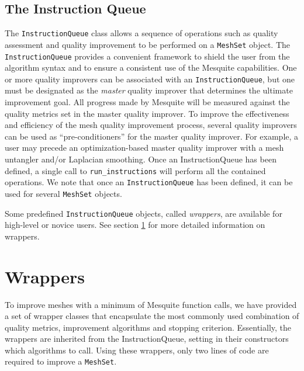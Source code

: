 \subsection{The Instruction Queue} \label{sec:IQ}

The \texttt{InstructionQueue} class allows a sequence of operations
such as quality assessment and quality improvement to be performed on
a \texttt{MeshSet} object. The \texttt{InstructionQueue} 
provides a convenient framework to shield the user
from the algorithm syntax and to ensure a consistent use of the
Mesquite capabilities.  One or more quality improvers can be
associated with an {\tt InstructionQueue}, but one must be designated
as the {\it master} quality improver that determines the ultimate 
improvement goal.  All progress made by Mesquite will be
measured against the quality metrics set in the master quality
improver.  To improve the effectiveness and efficiency of the mesh
quality improvement process, several quality improvers can be used as
``pre-conditioners'' for the master quality improver.  For example, a
user may precede an optimization-based master quality improver with a
mesh untangler and/or Laplacian smoothing.  Once an
InstructionQueue has been defined, a single call to \texttt{run\_instructions} 
will perform all the contained operations.  We note
that once an \texttt{InstructionQueue} has been defined, it can be used
for several \texttt{MeshSet} objects.


Some predefined \texttt{InstructionQueue} objects, called \emph
{wrappers}, are available for high-level or novice users.  See
section \ref{sec:wrappers} for more detailed information on wrappers.


\section{Wrappers}
\label{sec:wrappers}
To improve meshes with a minimum of Mesquite function calls, we have 
provided a set of wrapper classes that encapsulate the 
most commonly used combination of quality metrics, improvement
algorithms and stopping criterion. Essentially, the wrappers are
inherited from the InstructionQueue, setting in their constructors
which algorithms to call. Using these wrappers, only
two lines of code are required to improve a \texttt{MeshSet}.

